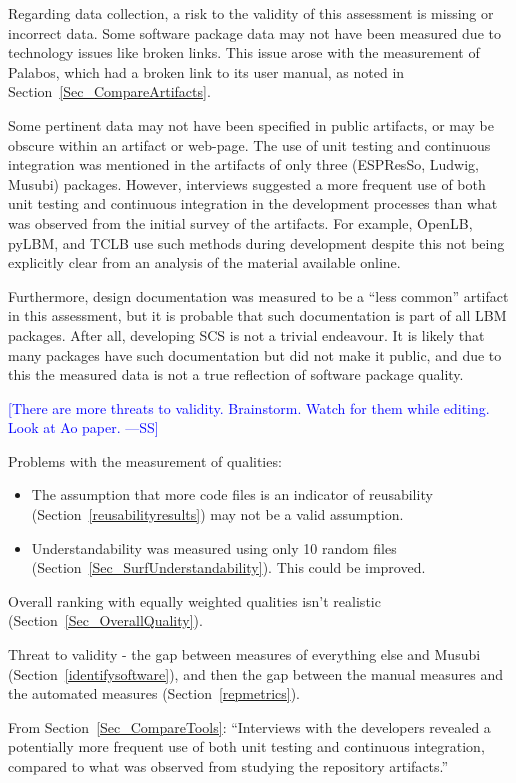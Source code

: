\documentclass[final, 3p, times, authoryear]{elsarticle}
\newcommand{\authornote}[3]{\textcolor{#1}{[#3 ---#2]}}
\newcommand{\authornote}[3]{}
\newcommand{\wss}[1]{\authornote{blue}{SS}{#1}} %
\begin{document}
Regarding data collection, a risk to the validity of this assessment is missing
or incorrect data. Some software package data may not have been measured due to
technology issues like broken links. This issue arose with the measurement of
Palabos, which had a broken link to its user manual, as noted in
Section~\ref{Sec_CompareArtifacts}. 

Some pertinent data may not have been specified in public artifacts, or may be
obscure within an artifact or web-page. The use of unit testing and continuous
integration was mentioned in the artifacts of only three (ESPResSo, Ludwig,
Musubi) packages. However, interviews suggested a more frequent use of both unit
testing and continuous integration in the development processes than what was
observed from the initial survey of the artifacts. For example, OpenLB, pyLBM,
and TCLB use such methods during development despite this not being explicitly
clear from an analysis of the material available online. 

Furthermore, design documentation was measured to be a ``less common'' artifact
in this assessment, but it is probable that such documentation is part of all
LBM packages. After all, developing SCS is not a trivial endeavour. It is likely
that many packages have such documentation but did not make it public, and due
to this the measured data is not a true reflection of software package quality.

\wss{There are more threats to validity.  Brainstorm.  Watch for them while 
editing.  Look at Ao paper.}

Problems with the measurement of qualities:

\begin{itemize}
\item The assumption that more code files is an indicator of reusability
(Section~\ref{reusabilityresults}) may not be a valid assumption.
\item Understandability was measured using only 10 random files
(Section~\ref{Sec_SurfUnderstandability}).  This could be improved.
\end{itemize}

Overall ranking with equally weighted qualities isn't realistic (Section~\ref{Sec_OverallQuality}).

Threat to validity - the gap between measures of everything else and Musubi
(Section~\ref{identifysoftware}), and then the gap between the manual measures
and the automated measures (Section~\ref{repmetrics}).

From Section~\ref{Sec_CompareTools}: ``Interviews with the developers revealed a
potentially more frequent use of both unit testing and continuous integration,
compared to what was observed from studying the repository artifacts.''
\end{document}
